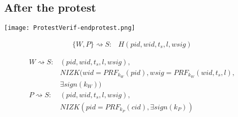 \begin{frame}
  \centering
\end{frame}

\subsection{After the protest}

\begin{frame}
  \centering
  \texttt{[image: ProtestVerif-endprotest.png]}
\end{frame}

\begin{frame}
  \begin{align*}
    \{W, P\}\rightsquigarrow S\colon & H(pid, wid, t_s, l, wsig)
  \end{align*}
\end{frame}

\begin{frame}
  \begin{align*}
    W\rightsquigarrow S\colon & (pid, wid, t_s, l, wsig),\\
    & NIZK(wid = PRF_{k_W}(pid), wsig = PRF_{k_W}(wid, t_s, l),\\
    & \exists sign(k_W)) \\
    P\rightsquigarrow S\colon & (pid, wid, t_s, l, wsig),\\
    & NIZK(pid = PRF_{k_P}(cid), \exists sign(k_P))
  \end{align*}
\end{frame}


